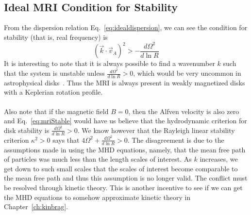 \subsection{Ideal MRI Condition for Stability}
From the dispersion relation Eq.~\ref{eq:idealdispersion}, we can see the condition for stability (that is, real frequency) is
\begin{equation}
  (\vec k\cdot\vec v_A)^2>-\frac{d\Omega^2}{d\ln R}
\end{equation}
It is interesting to note that it is always possible to find a wavenumber $k$ such that the system is unstable unless $\frac{d\Omega^2}{d\ln R}>0$, which would be very uncommon in astrophysical disks~\cite{BH1998}. Thus the MRI is always present in weakly magnetized disks with a Keplerian rotation profile.\\
\\
Also note that if the magnetic field $B=0$, then the Alfven velocity is also zero and Eq.~\ref{eq:mriStable} would have us believe that the hydrodynamic criterion for disk stability is $\frac{d\Omega^2}{d\ln R}>0$. We know however that the Rayleigh linear stability criterion $\kappa^2>0$ says that $4\Omega^2+\frac{d\Omega^2}{d\ln R}>0$. The disagreement is due to the assumptions made in using the MHD equations, namely, that the mean free path of particles was much less than the length scales of interest. As $k$ increases, we get down to such small scales that the scales of interest become comparable to the mean free path and thus this assumption is no longer valid. The conflict must be resolved through kinetic theory. This is another incentive to see if we can get the MHD equations to somehow approximate kinetic theory in Chapter~\ref{ch:kinbrag}.

